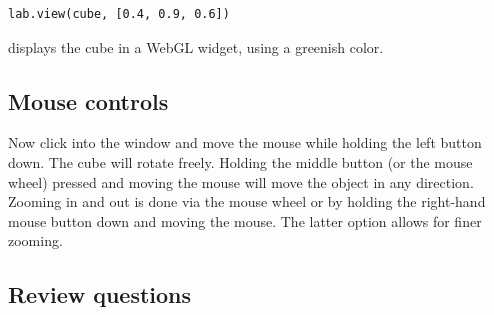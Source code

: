 \documentclass{article}
\begin{document}
\begin{verbatim}
lab.view(cube, [0.4, 0.9, 0.6])
\end{verbatim}
displays the cube in a WebGL widget, using a greenish color. 

\subsection{Mouse controls}

Now click into the window and move the mouse while holding the left
button down. The cube will rotate freely. Holding the middle
button (or the mouse wheel) pressed and moving the mouse will move the 
object in any direction. Zooming in and out is done via the mouse wheel 
or by holding the right-hand mouse button down and moving the mouse.
The latter option allows for finer zooming.

\subsection{Review questions}
\end{document}
